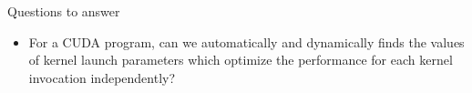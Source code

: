 \begin{frame}{Questions to answer}
	\begin{block}{}
		\begin{itemize}
			\item For a CUDA program, can we automatically and dynamically finds the values of kernel launch parameters which optimize the performance for each kernel invocation independently?
		\end{itemize}
	\end{block}
\end{frame}


